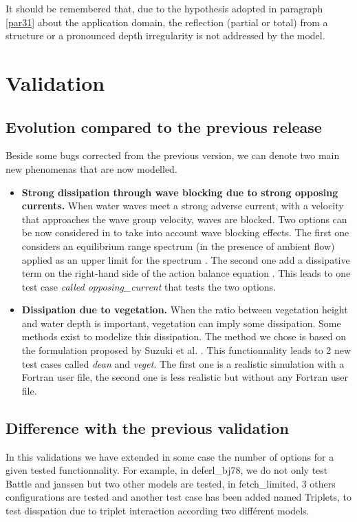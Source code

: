 It should be remembered that, due to the hypothesis adopted in paragraph \ref{par31} about the \tomawac application domain, the reflection (partial or total) from a structure or a pronounced depth irregularity is not addressed by the model.

\chapter{Validation}
%
\section{Evolution compared to the previous release}
Beside some bugs corrected from the previous version, we can denote two main new phenomenas that are now modelled. 
\begin{itemize}
\item {\bf Strong dissipation through wave blocking due to strong opposing currents.} When water waves meet a strong adverse current, with a velocity that approaches the wave group velocity, waves are blocked. Two options can be now considered in \tomawac to take into account wave blocking effects. The first one considers an equilibrium range spectrum (in the presence of ambient flow) applied as an upper limit for the spectrum  \cite{Hedges1985}. The second one add a dissipative term on the right-hand side of the action balance equation \cite{Westhuys2012}. This leads to one test case {\it called opposing\_current} that tests the two options.  
\item {\bf Dissipation due to vegetation.} When the ratio between vegetation height and water depth is important, vegetation can imply some dissipation. Some methods exist  to modelize this dissipation. The method we chose is based on the formulation proposed by Suzuki et al. \cite{Suzuki2011}. This functionnality leads to 2 new test cases called {\it dean } and {\it veget}. The first one is a realistic simulation with a Fortran user file, the second one is less realistic but without any Fortran user file. 
\end {itemize} 
\section{Difference with the previous validation}
In this validations we have extended in some case the number of options for a given tested functionnality. For example, in deferl\_bj78, we do not only test Battle and janssen but two other models are tested, in fetch\_limited, 3 others configurations are tested and another test case has been added named Triplets, to test disspation due to triplet interaction according two différent models.

